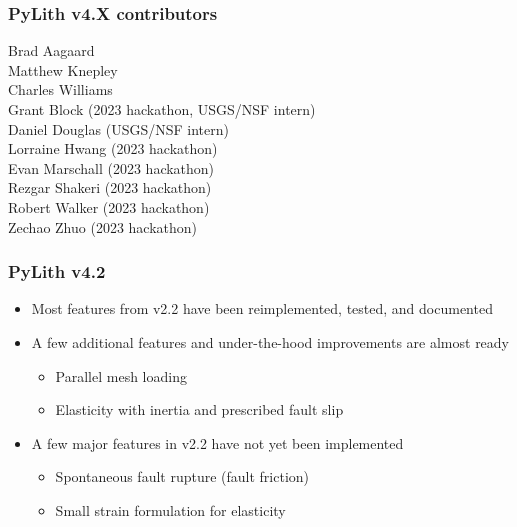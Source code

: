\documentclass[aspectratio=169]{beamer}
\begin{document}
\begin{frame}
  \frametitle{PyLith v4.X contributors}

  Brad Aagaard \\
  Matthew Knepley \\
  Charles Williams \\[\baselineskip]
  Grant Block (2023 hackathon, USGS/NSF intern) \\
  Daniel Douglas (USGS/NSF intern) \\
  Lorraine Hwang (2023 hackathon) \\
  Evan Marschall (2023 hackathon) \\
  Rezgar Shakeri (2023 hackathon) \\
  Robert Walker (2023 hackathon) \\
  Zechao Zhuo (2023 hackathon)

\end{frame}


\begin{frame}
  \frametitle{PyLith v4.2}
  \summary{}

  \begin{itemize}
  \item Most features from v2.2 have been reimplemented, tested, and documented
  \item A few additional features and under-the-hood improvements are almost ready
    \begin{itemize}
    \item Parallel mesh loading
    \item Elasticity with inertia and prescribed fault slip
    \end{itemize}
  \item A few major features in v2.2 have not yet been implemented
    \begin{itemize}
    \item Spontaneous fault rupture (fault friction)
    \item Small strain formulation for elasticity
    \end{itemize}    
  \end{itemize}

\end{frame}
\end{document}
